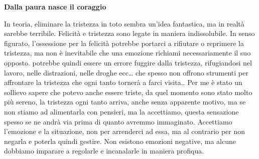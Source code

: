 \documentclass[12pt]{book} %
\begin{document}
\textbf{Dalla paura nasce il coraggio}

In teoria, eliminare la tristezza in toto sembra un'idea fantastica, ma in realtà sarebbe terribile. Felicità e
tristezza sono legate in maniera indissolubile. In senso figurato, l’ossessione per la felicità potrebbe portarci a rifiutare o reprimere la tristezza, ma non è inevitabile che una emozione richiami necessariamente il suo opposto. potrebbe quindi essere un errore fuggire dalla tristezza,
rifugiandosi nel lavoro, nelle distrazioni, nelle droghe ecc… che spesso non offrono strumenti per affrontare la tristezza che ogni
tanto tornerà a farci visita.. Per me è stato un sollievo sapere che potevo anche essere triste, da quel momento sono
stato molto più sereno, la tristezza ogni tanto arriva, anche senza apparente motivo, ma se non stiamo ad alimentarla
con pensieri, ma la accettiamo, questa sensazione spesso se ne andrà via prima di quanto avremmo immaginato. Accettiamo
l'emozione e la situazione, non per arrenderci ad essa, ma al contrario per non negarla e poterla quindi gestire.
Non esistono emozioni negative, ma alcune dobbiamo imparare a regolarle e incanalarle in maniera profiqua.
\end{document}
